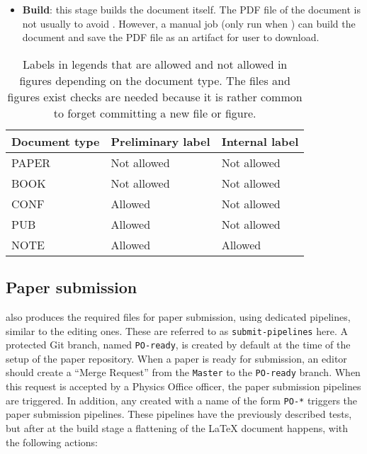 \begin{itemize}
\item \textbf{Build}: this stage builds the document itself. The PDF file of the document is not usually  to avoid .
However, a manual job (only run when ) can build the document and save the PDF file as an artifact for  user to download.
\end{itemize}

\begin{table}[htb]
  \centering
  \begin{tabular}{lll}\toprule
    Document type & Preliminary label & Internal label \\
    \midrule
    PAPER & Not allowed & Not allowed \\
    BOOK & Not allowed & Not allowed \\
    CONF & Allowed & Not allowed \\
    PUB & Allowed & Not allowed \\
    NOTE & Allowed & Allowed \\
    \bottomrule
  \end{tabular}
  \caption{Labels in legends that are allowed and not allowed in figures depending on the document type.
  The files and figures exist checks are needed because it is rather common to forget committing a new file or figure. }%
  \label{tab:labels}
\end{table}

\subsection{Paper submission}%
\label{sec:Paper_submission}

 also produces the required files for paper submission, using dedicated pipelines, similar to the editing ones.
These are referred to as \texttt{submit-pipelines} here.
A protected Git branch, named \texttt{PO-ready}, is created by default at the time of the setup of the paper repository.
When a paper is ready for submission, an editor should create a \enquote{Merge Request}
from the \texttt{Master} to the \texttt{PO-ready} branch.
When this request is accepted by a Physics Office officer, the paper submission pipelines are triggered.
In addition, any  created with a name of the form \texttt{PO-*} triggers the paper submission pipelines.
These pipelines have the previously described tests, but after at the build stage a flattening of the LaTeX document happens, with the following actions:


